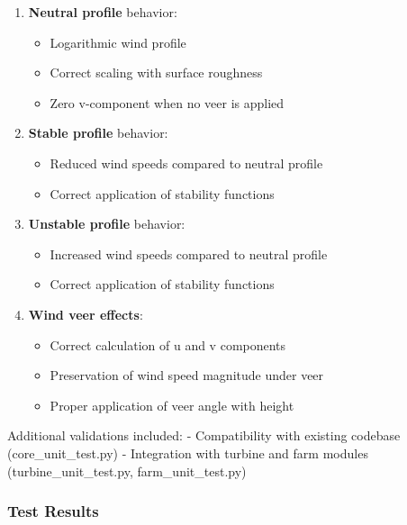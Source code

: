 \documentclass[
]{article}
\providecommand{\tightlist}{%
  \setlength{\itemsep}{0pt}\setlength{\parskip}{0pt}}
\begin{document}
\begin{enumerate}
\def\labelenumi{\arabic{enumi}.}
\tightlist
\item
  \textbf{Neutral profile} behavior:

  \begin{itemize}
  \tightlist
  \item
    Logarithmic wind profile
  \item
    Correct scaling with surface roughness
  \item
    Zero v-component when no veer is applied
  \end{itemize}
\item
  \textbf{Stable profile} behavior:

  \begin{itemize}
  \tightlist
  \item
    Reduced wind speeds compared to neutral profile
  \item
    Correct application of stability functions
  \end{itemize}
\item
  \textbf{Unstable profile} behavior:

  \begin{itemize}
  \tightlist
  \item
    Increased wind speeds compared to neutral profile
  \item
    Correct application of stability functions
  \end{itemize}
\item
  \textbf{Wind veer effects}:

  \begin{itemize}
  \tightlist
  \item
    Correct calculation of u and v components
  \item
    Preservation of wind speed magnitude under veer
  \item
    Proper application of veer angle with height
  \end{itemize}
\end{enumerate}

Additional validations included: - Compatibility with existing codebase
(core\_unit\_test.py) - Integration with turbine and farm modules
(turbine\_unit\_test.py, farm\_unit\_test.py)

\hypertarget{test-results}{%
\subsubsection{Test Results}\label{test-results}}
\end{document}
